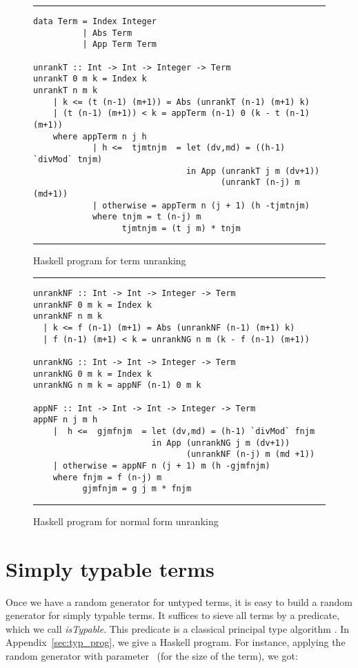 \documentclass{jfp1}
\begin{document}
\begin{figure*}
\centering
\hrule

\medskip

\begin{verbatim}
data Term = Index Integer
          | Abs Term
          | App Term Term

unrankT :: Int -> Int -> Integer -> Term
unrankT 0 m k = Index k
unrankT n m k
    | k <= (t (n-1) (m+1)) = Abs (unrankT (n-1) (m+1) k)
    | (t (n-1) (m+1)) < k = appTerm (n-1) 0 (k - t (n-1) (m+1))
    where appTerm n j h
            | h <=  tjmtnjm  = let (dv,md) = ((h-1) `divMod` tnjm) 
                               in App (unrankT j m (dv+1)) 
                                      (unrankT (n-j) m (md+1))
            | otherwise = appTerm n (j + 1) (h -tjmtnjm) 
            where tnjm = t (n-j) m
                  tjmtnjm = (t j m) * tnjm 
\end{verbatim}
\hrule
\caption{\textsf{Haskell} program for term unranking}
\label{fig:prog-gen}
\end{figure*}

\begin{figure*}[!htb]
  \centering
\hrule
\medskip
\begin{verbatim}
unrankNF :: Int -> Int -> Integer -> Term
unrankNF 0 m k = Index k
unrankNF n m k
  | k <= f (n-1) (m+1) = Abs (unrankNF (n-1) (m+1) k)
  | f (n-1) (m+1) < k = unrankNG n m (k - f (n-1) (m+1))

unrankNG :: Int -> Int -> Integer -> Term
unrankNG 0 m k = Index k
unrankNG n m k = appNF (n-1) 0 m k
                                   
appNF :: Int -> Int -> Int -> Integer -> Term
appNF n j m h
    |  h <=  gjmfnjm  = let (dv,md) = (h-1) `divMod` fnjm
                        in App (unrankNG j m (dv+1)) 
                               (unrankNF (n-j) m (md +1))
    | otherwise = appNF n (j + 1) m (h -gjmfnjm)
    where fnjm = f (n-j) m                            
          gjmfnjm = g j m * fnjm
\end{verbatim}
\hrule
  \caption{\textsf{Haskell} program for normal form unranking}
  \label{fig:nf}
\end{figure*}

\section{Simply typable terms}
\label{sec:simply-typed-terms}

Once we have a random generator for untyped terms, it is easy to build a random generator
for simply typable terms. It suffices to sieve all terms by a predicate, which we call
\emph{isTypable}. This predicate is a classical principal type
algorithm
\cite{newman43:_strat,DBLP:conf/popl/DamasM82,DBLP:journals/logcom/Hindley08}.  In
Appendix~\ref{sec:typ_prog}, we give a \textsf{Haskell} program.
For instance,
applying the random generator with parameter~ (for the size of the term), we got:
\end{document}
